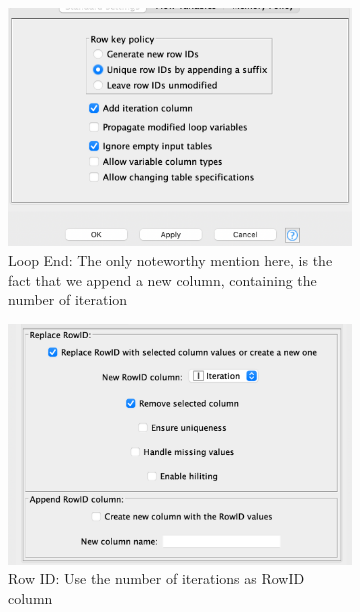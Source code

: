 \documentclass[11pt]{article}
\begin{document}
\begin{figure}[H]
\begin{subfigure}{0.4\textwidth}
					\includegraphics[width=\textwidth]{res/t1/t15/t15-loop-end-conf}
					\caption{Loop End: The only noteworthy mention here, is the fact that we append a new column, containing the number of iteration}
					\label{fig:third}
				\end{subfigure}	
				\begin{subfigure}{0.4\textwidth}
					\includegraphics[width=\textwidth]{res/t1/t15/t15-row-id-conf}
					\caption{Row ID: Use the number of iterations as RowID column}
					\label{fig:first}
				\end{subfigure}
				\hfill
				\begin{subfigure}{0.4\textwidth}

\end{subfigure}
\end{figure}
\end{document}
